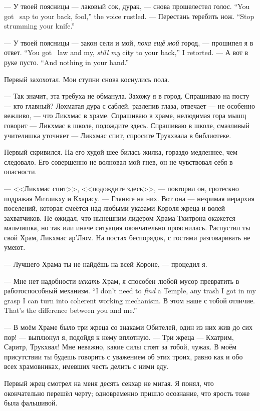 {--- У твоей поясницы --- лаковый сок, дурак, --- снова прошелестел голос.}
{``You got \laaka\ sap to your back, fool,'' the voice rustled.}
{--- Перестань теребить нож.}
{``Stop strumming your knife.''}

{--- У твоей поясницы --- закон сели и мой, \emph{пока ещё мой} город, --- прошипел я в ответ.}
{``You got \Seli\ law and my, \emph{still my} city to your back,'' I retorted.}
{--- А вот в руке пусто.}
{``And nothing in your hand.''}

Первый захохотал.
Мои ступни снова коснулись пола.

--- Так значит, эта требуха не обманула.
Захожу я в город.
Спрашиваю на посту --- кто главный?
Лохматая дура с саблей, разлепив глаза, отвечает --- не особенно вежливо, --- что Ликхмас в храме.
Спрашиваю в храме, нелюдимая гора мышц говорит --- Ликхмас в школе, подождите здесь.
Спрашиваю в школе, смазливый учителишка уточняет --- Ликхмас спит, спросите Трукхвала в библиотеке.

Первый скривился.
На его худой шее билась жилка, гораздо медленнее, чем следовало.
Его совершенно не волновал мой гнев, он не чувствовал себя в опасности.

--- <<Ликхмас спит>>, <<подождите здесь>>, --- повторил он, гротескно подражая Митликху и Кхарасу.
--- Гляньте на них.
Вот она --- незримая иерархия поселений, которая смеётся над любыми указами Короля-жреца и волей захватчиков.
Не ожидал, что нынешним лидером Храма Тхитрона окажется мальчишка, но так или иначе ситуация окончательно прояснилась.
Распустил ты свой Храм, Ликхмас ар'Люм.
На постах беспорядок, с гостями разговаривать не умеют.

--- Лучшего Храма ты не найдёшь на всей Короне, --- процедил я.

{--- Мне нет надобности \emph{искать} Храм, я способен любой мусор превратить в работоспособный механизм.}
{``I don't need to \emph{find} a Temple, any trash I got in my grasp I can turn into coherent working mechanism.}
{В этом наше с тобой отличие.}
{That's the difference between you and me.''}

--- В моём Храме было три жреца со знаками Обителей, один из них жив до сих пор! --- выплюнул я, подойдя к нему вплотную.
--- Три жреца --- Кхатрим, Саритр, Трукхвал!
Мне неважно, какие силы стоят за тобой, чужак.
В моём присутствии ты будешь говорить с уважением об этих троих, равно как и обо всех храмовниках, имевших честь делить с ними еду.

Первый жрец смотрел на меня десять секхар не мигая.
Я понял, что окончательно перешёл черту;
одновременно пришло осознание, что ярость тоже была фальшивой.

